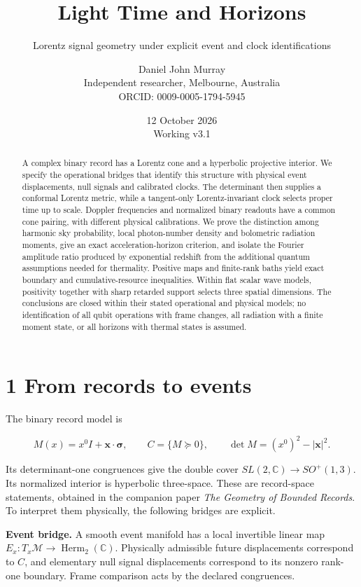 \documentclass[
  11pt,
  a4paper,
]{article}
\title{Light Time and Horizons}
\subtitle{Lorentz signal geometry under explicit event and clock identifications}
\author{Daniel John Murray\\{\small Independent researcher, Melbourne, Australia}\\{\small ORCID: 0009-0005-1794-5945}}
\date{12 October 2026\\{\small Working v3.1}}
\begin{document}
\maketitle
\begin{abstract}
A complex binary record has a Lorentz cone and a hyperbolic projective interior. We specify the operational bridges that identify this structure with physical event displacements, null signals and calibrated clocks. The determinant then supplies a conformal Lorentz metric, while a tangent-only Lorentz-invariant clock selects proper time up to scale. Doppler frequencies and normalized binary readouts have a common cone pairing, with different physical calibrations. We prove the distinction among harmonic sky probability, local photon-number density and bolometric radiation moments, give an exact acceleration-horizon criterion, and isolate the Fourier amplitude ratio produced by exponential redshift from the additional quantum assumptions needed for thermality. Positive maps and finite-rank baths yield exact boundary and cumulative-resource inequalities. Within flat scalar wave models, positivity together with sharp retarded support selects three spatial dimensions. The conclusions are closed within their stated operational and physical models; no identification of all qubit operations with frame changes, all radiation with a finite moment state, or all horizons with thermal states is assumed.
\end{abstract}

\section{1 From records to events}\label{from-records-to-events}

The binary record model is

\[M(x)=x^0I+\mathbf x\cdot\boldsymbol\sigma,\qquad
C=\{M\succeq0\},\qquad \det M=(x^0)^2-|\mathbf x|^2.\]

Its determinant-one congruences give the double cover \(SL(2,\mathbb C)\to SO^+(1,3)\). Its normalized interior is hyperbolic three-space. These are record-space statements, obtained in the companion paper \emph{The Geometry of Bounded Records}. To interpret them physically, the following bridges are explicit.

\textbf{Event bridge.} A smooth event manifold has a local invertible linear map \(E_x:T_x\mathcal M\to\operatorname{Herm}_2(\mathbb C)\). Physically admissible future displacements correspond to \(C\), and elementary null signal displacements correspond to its nonzero rank-one boundary. Frame comparison acts by the declared congruences.
\end{document}
